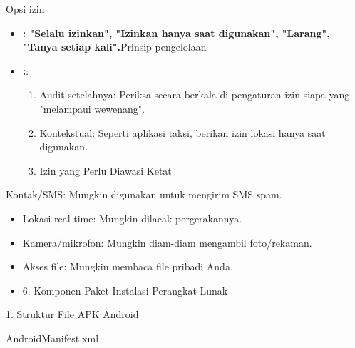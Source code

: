 
Opsi izin

\begin{itemize}
  \item \textbf{: "Selalu izinkan", "Izinkan hanya saat digunakan", "Larang", "Tanya setiap kali".}Prinsip pengelolaan
  \item \textbf{:}:
  \begin{enumerate}
    \item Audit setelahnya: Periksa secara berkala di pengaturan izin siapa yang "melampaui wewenang".
    \item Kontekstual: Seperti aplikasi taksi, berikan izin lokasi hanya saat digunakan.
    \item Izin yang Perlu Diawasi Ketat
  \end{enumerate}
\end{itemize}

\begin{tcbwarn}{Kontak/SMS: Mungkin digunakan untuk mengirim SMS spam.}
\begin{itemize}
  \item Lokasi real-time: Mungkin dilacak pergerakannya.
  \item Kamera/mikrofon: Mungkin diam-diam mengambil foto/rekaman.
  \item Akses file: Mungkin membaca file pribadi Anda.
  \item 6. Komponen Paket Instalasi Perangkat Lunak
\end{itemize}

\end{tcbwarn}


1. Struktur File APK Android


AndroidManifest.xml

